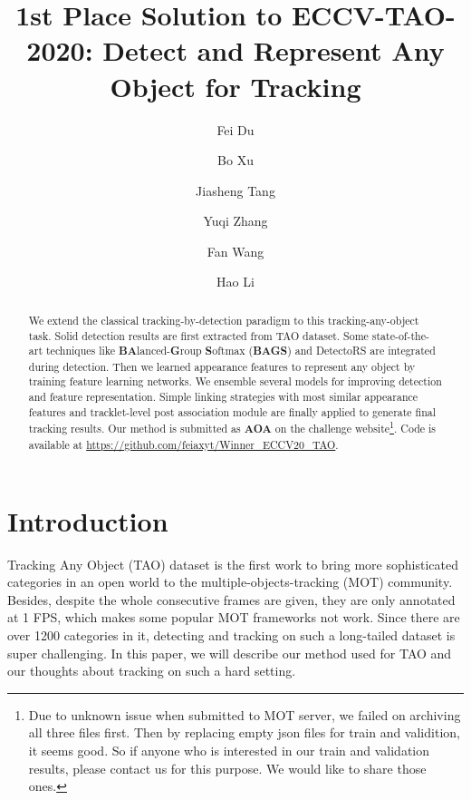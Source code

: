 \documentclass[runningheads]{llncs}
\begin{document}
\pagestyle{headings}
\mainmatter
\def\ECCVSubNumber{100}  

\title{1st Place Solution to ECCV-TAO-2020: Detect and Represent Any Object for Tracking} 



\author{Fei Du \and
Bo Xu \and
Jiasheng Tang \and
Yuqi Zhang \and
Fan Wang \and
Hao Li
}
\maketitle

\begin{abstract}
   We extend the classical tracking-by-detection paradigm to this tracking-any-object task. Solid detection results are first extracted from TAO dataset. Some state-of-the-art techniques like \textbf{BA}lanced-\textbf{G}roup \textbf{S}oftmax (\textbf{BAGS}\cite{li2020overcoming}) and DetectoRS\cite{qiao2020detectors} are integrated during detection. Then we learned appearance features to represent any object by training feature learning networks. We ensemble several models for improving detection and feature representation. Simple linking strategies with most similar appearance features and tracklet-level post association module are finally applied to generate final tracking results. Our method is submitted as \textbf{AOA} on the challenge website\footnote{Due to unknown issue when submitted to MOT server, we failed on archiving all three files first. Then by replacing empty json files for train and validition, it seems good. So if anyone who is interested in our train and validation results, please contact us for this purpose. We would like to share those ones.}. Code is available at \url{https://github.com/feiaxyt/Winner_ECCV20_TAO}.
\end{abstract}

\section{Introduction}
Tracking Any Object (TAO)\cite{2020TAO} dataset is the first work to bring more sophisticated categories in an open world to the multiple-objects-tracking (MOT) community. Besides, despite the whole consecutive frames are given, they are only annotated at 1 FPS, which makes some popular MOT frameworks not work. Since there are over 1200 categories in it, detecting and tracking on such a long-tailed dataset is super challenging. In this paper, we will describe our method used for TAO and our thoughts about tracking on such a hard setting.
\end{document}
